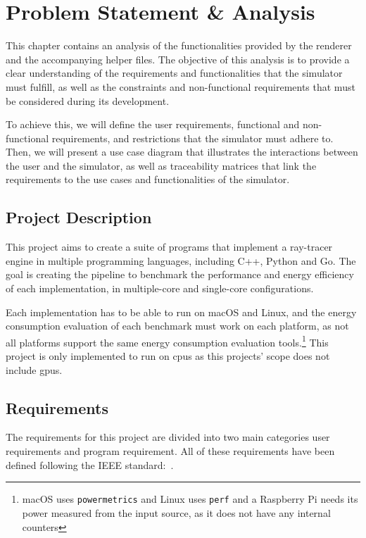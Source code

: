 \chapter{Problem Statement \& Analysis}\label{chap:analysis}

This chapter contains an analysis of the functionalities provided by the renderer and the accompanying helper files. The objective of this analysis is to provide a clear understanding of the requirements and functionalities that the simulator must fulfill, as well as the constraints and non-functional requirements that must be considered during its development.

To achieve this, we will define the user requirements, functional and non-functional requirements, and restrictions that the simulator must adhere to. Then, we will present a use case diagram that illustrates the interactions between the user and the simulator, as well as traceability matrices that link the requirements to the use cases and functionalities of the simulator.

\section{Project Description}
This project aims to create a suite of programs that implement a ray-tracer engine in multiple programming languages, including C++, Python and Go. The goal is creating the pipeline to benchmark the performance and energy efficiency of each implementation, in multiple-core and single-core configurations.

Each implementation has to be able to run on macOS and Linux, and the energy consumption evaluation of each benchmark must work on each platform, as not all platforms support the same energy consumption evaluation tools.\footnote{macOS uses \texttt{powermetrics} and Linux uses \texttt{perf} and a Raspberry Pi needs its power measured from the input source, as it does not have any internal counters} This project is only implemented to run on \glspl{cpu} as this projects' scope does not include \glspl{gpu}.


\section{Requirements}


The requirements for this project are divided into two main categories user requirements and program requirement. All of these requirements have been defined following the IEEE standard:~\autocite{requirements-engineering-iso}. 

